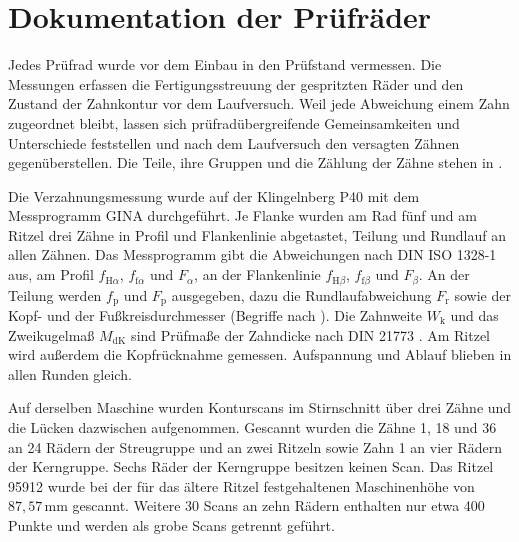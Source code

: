 \section{Dokumentation der Prüfräder}
\label{sec:dokumentation_pruefraeder}

Jedes Prüfrad wurde vor dem Einbau in den Prüfstand vermessen. Die Messungen erfassen die Fertigungsstreuung der gespritzten Räder und den Zustand der Zahnkontur vor dem Laufversuch. Weil jede Abweichung einem Zahn zugeordnet bleibt, lassen sich prüfradübergreifende Gemeinsamkeiten und Unterschiede feststellen und nach dem Laufversuch den versagten Zähnen gegenüberstellen. Die Teile, ihre Gruppen und die Zählung der Zähne stehen in .


Die Verzahnungsmessung wurde auf der Klingelnberg P40 mit dem Messprogramm GINA durchgeführt. Je Flanke wurden am Rad fünf und am Ritzel drei Zähne in Profil und Flankenlinie abgetastet, Teilung und Rundlauf an allen Zähnen. Das Messprogramm gibt die Abweichungen nach DIN ISO 1328-1 \cite{DINISO1328-1} aus, am Profil $f_{\mathrm{H}\alpha}$, $f_{\mathrm{f}\alpha}$ und $F_{\alpha}$, an der Flankenlinie $f_{\mathrm{H}\beta}$, $f_{\mathrm{f}\beta}$ und $F_{\beta}$. An der Teilung werden $f_{\mathrm{p}}$ und $F_{\mathrm{p}}$ ausgegeben, dazu die Rundlaufabweichung $F_{\mathrm{r}}$ sowie der Kopf- und der Fußkreisdurchmesser (Begriffe nach \cite[Abschnitte 5.3 und 5.4, S.~33 und 36]{DIN21772}). Die Zahnweite $W_{\mathrm{k}}$ und das Zweikugelmaß $M_{\mathrm{dK}}$ sind Prüfmaße der Zahndicke nach DIN 21773 \cite{DIN21773}. Am Ritzel wird außerdem die Kopfrücknahme gemessen. Aufspannung und Ablauf blieben in allen Runden gleich.

Auf derselben Maschine wurden Konturscans im Stirnschnitt über drei Zähne und die Lücken dazwischen aufgenommen. Gescannt wurden die Zähne 1, 18 und 36 an 24 Rädern der Streugruppe und an zwei Ritzeln sowie Zahn 1 an vier Rädern der Kerngruppe. Sechs Räder der Kerngruppe besitzen keinen Scan. Das Ritzel 95912 wurde bei der für das ältere Ritzel festgehaltenen Maschinenhöhe von $87{,}57$\,mm gescannt. Weitere 30 Scans an zehn Rädern enthalten nur etwa 400 Punkte und werden als grobe Scans getrennt geführt.

